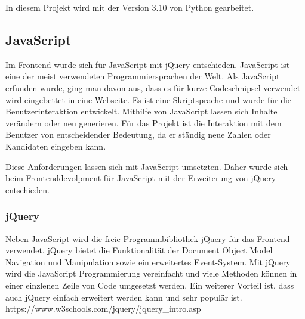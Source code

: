 In diesem Projekt wird mit der Version 3.10 von Python gearbeitet. \cite{Python} \cite{DataToolkit}

\subsection{JavaScript}
Im Frontend wurde sich für JavaScript mit jQuery entschieden. JavaScript ist eine der meist verwendeten Programmiersprachen der Welt. Als JavaScript erfunden wurde, ging man davon aus, dass es für kurze Codeschnipsel verwendet wird eingebettet in eine Webseite. Es ist eine Skriptsprache und wurde für die Benutzerinteraktion entwickelt. Mithilfe von JavaScript lassen sich Inhalte verändern oder neu generieren. Für das Projekt ist die Interaktion mit dem Benutzer von entscheidender Bedeutung, da er ständig neue Zahlen oder Kandidaten eingeben kann. 

Diese Anforderungen lassen sich mit JavaScript umsetzten. Daher wurde sich beim Frontenddevolpment für JavaScript mit der Erweiterung von jQuery entschieden. 


\subsubsection{jQuery}
Neben JavaScript wird die freie Programmbibliothek jQuery für das Frontend verwendet. jQuery bietet die Funktionalität der Document Object Model Navigation und Manipulation sowie ein erweitertes Event-System. Mit jQuery wird die JavaScript Programmierung vereinfacht und viele Methoden können in einer einzlenen Zeile von Code umgesetzt werden. Ein weiterer Vorteil ist, dass auch jQuery einfach erweitert werden kann und sehr populär ist. https://www.w3schools.com/jquery/jquery\_intro.asp


